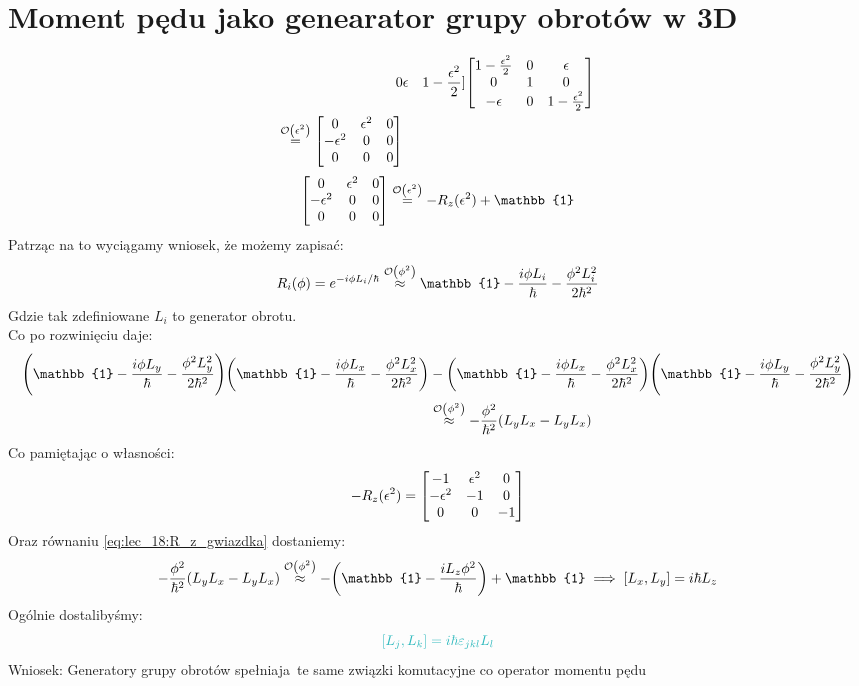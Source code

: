 \documentclass[12pt,a4paper]{report}
\newcommand{\wniosek}[1]{{\color{Apricot} Wniosek:} #1}
\newcommand{\Id}{\mathbb{1}}
\newenvironment{lecture}[1]{\par\medskip
   \noindent\chapter{#1} \rmfamily}{\medskip}
\begin{document}
\begin{lecture}{Moment pędu jako genearator grupy obrotów w 3D}
\begin{itemize}
\begin{align*}
        0 & \epsilon & 1 - \frac{\epsilon^2}{2}
        ]
        \mqty[
        1 - \frac{\epsilon^2}{2} & 0 & \epsilon\\
        0 & 1 & 0\\
        - \epsilon & 0 & 1 - \frac{\epsilon^2}{2}
        ]\\
        \stackrel{\order{\epsilon^2}}{=}
        \mqty[
        0 & \epsilon^2 & 0\\
        -\epsilon^2 & 0 & 0\\
        0 & 0 & 0
        ]
    \end{align*}
    \begin{equation}
        \mqty[
        0 & \epsilon^2 & 0\\
        -\epsilon^2 & 0 & 0\\
        0 & 0 & 0
        ]
        \stackrel{\order{\epsilon^2}}{=}
        - R_z(\epsilon^2) + \Id
        \label{eq:lec_18:R_z_gwiazdka}
    \end{equation}
    Patrząc na to wyciągamy wniosek, że możemy zapisać:\\
    \[
        R_i(\phi) = e^{-i\phi L_i/\hbar } \stackrel{\order{\phi^2}}{\approx} \Id - \frac{i \phi L_i}{\hbar} - \frac{\phi^2 L_i^2}{2\hbar^2}
    \]
    Gdzie tak zdefiniowane $L_i$ to generator obrotu.\\
    Co po rozwinięciu daje:
    \begin{align*}
        \qty(\Id - \frac{i \phi L_y}{\hbar} - \frac{\phi^2 L_y^2}{2\hbar^2})\qty(\Id - \frac{i \phi L_x}{\hbar} - \frac{\phi^2 L_x^2}{2\hbar^2}) &- \qty(\Id - \frac{i \phi L_x}{\hbar} - \frac{\phi^2 L_x^2}{2\hbar^2})\qty(\Id - \frac{i \phi L_y}{\hbar} - \frac{\phi^2 L_y^2}{2\hbar^2})\\
        &\stackrel{\order{\phi^2}}{\approx} - \frac{\phi^2}{\hbar^2} \qty(L_yL_x - L_yL_x)
    \end{align*}
    Co pamiętając o własności:
    \[
        -R_z(\epsilon^2) = \mqty[
        -1 & \epsilon^2 & 0 \\
        -\epsilon^2 & -1 & 0\\
        0 & 0 & -1
        ]
    \]
    Oraz równaniu \eqref{eq:lec_18:R_z_gwiazdka} dostaniemy:
    \[
        - \frac{\phi^2}{\hbar^2} \qty(L_yL_x - L_yL_x) \stackrel{\order{\phi^2}}{\approx} - \qty(\Id - \frac{i L_z\phi^2}{\hbar}) + \Id \implies \comm{L_x}{L_y} = i\hbar L_z
    \]
    Ogólnie dostalibyśmy:
    \[
        \color{Aquamarine} \comm{L_j}{L_k} = i \hbar \varepsilon_{jkl}L_l
    \]
    \wniosek Generatory grupy obrotów spełniaja te same związki komutacyjne co operator momentu pędu

\end{itemize}
\end{lecture}
\end{document}

